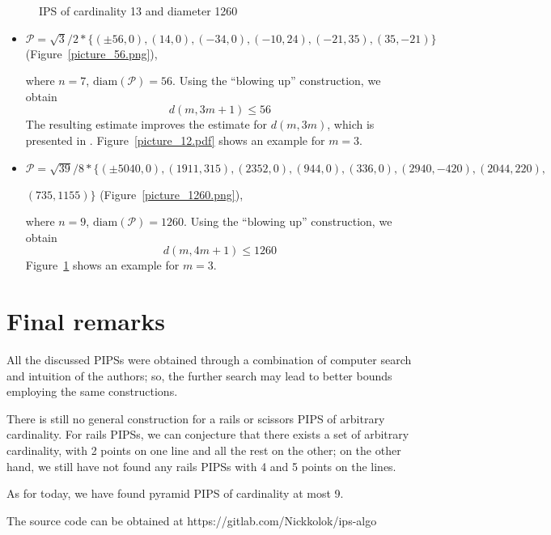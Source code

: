 \documentclass[12pt]{article}
\theoremstyle{theorem}
\theoremstyle{dfn}
\theoremstyle{remark}
\begin{document}
\begin{figure}[h!]
\parbox{1\linewidth}{\caption{IPS of cardinality 13 and diameter 1260}
\label{picture_1260_R3.pdf}}
\end{figure}

\begin{itemize}
\setlength{\itemsep}{-1mm}


\item
$\mathcal{P}=\sqrt{3}/{2} * \{ (\pm 56, 0),
(14, 0),
(-34, 0),
(-10, 24),
(-21 , 35),
(35, -21)\}
$
(Figure~\ref{picture_56.png}),

where $n = 7$, $\operatorname{diam(\mathcal{P})} = 56$. Using the ``blowing up''
construction, we obtain
\begin{equation}\label{result2}
d(m, 3m + 1) \leq 56
\end{equation}
The resulting estimate improves the estimate for $d(m, 3m)$, which is presented
in \cite{kemnitz1988punktmengen}. Figure~\ref{picture_12.pdf} shows an example
for $m = 3$.


\item
$\mathcal{P}=\sqrt{39}/{8} * \{ (\pm 5040, 0),
(1911, 315),
(2352, 0),
(944, 0),
(336, 0),
(2940, -420),
(2044, 220),
$

$
(735, 1155)\}
$
(Figure~\ref{picture_1260.png}),

where $n = 9$, $\operatorname{diam(\mathcal{P})} = 1260$. Using the ``blowing up''
construction, we obtain
\begin{equation}\label{result3}
d(m, 4m + 1) \leq 1260
\end{equation}
Figure~\ref{picture_1260_R3.pdf} shows an example for $m = 3$.

\end{itemize}

\section{Final remarks}
All the discussed PIPSs were obtained through a combination of computer search and intuition of the authors;
so, the further search may lead to better bounds employing the same constructions.

There is still no general construction for a rails or scissors PIPS of arbitrary cardinality.
For rails PIPSs, we can conjecture that there exists a set of arbitrary cardinality, with 2 points on one line
and all the rest on the other;
on the other hand, we still have not found any rails PIPSs with 4 and 5 points on the lines.

As for today, we have found pyramid PIPS of cardinality at most 9.

The source code can be obtained at https://gitlab.com/Nickkolok/ips-algo

\printbibliography
%
\end{document}
